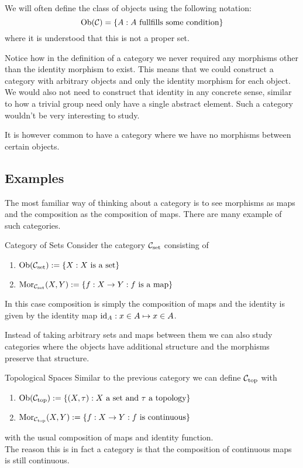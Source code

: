 \begin{notation}{}{}
We will often define the class of objects using the following notation:
\begin{equation*}
    \mathrm {Ob}(\mathcal{C}) = \{A: \text{$A$ fullfills some condition}\}
\end{equation*}
where it is understood that this is not a proper set.
\end{notation}

Notice how in the definition of a category we never required any morphisms other than the identity morphism to exist. This means that we could construct a category with arbitrary objects and only the identity morphism for each object. We would also not need to construct that identity in any concrete sense, similar to how a trivial group need only have a single abstract element.
Such a category wouldn't be very interesting to study.

It is however common to have a category where we have no morphisms between certain objects.

\subsection{Examples}

The most familiar way of thinking about a category is to see morphisms as maps and the composition as the composition of maps. There are many example of such categories.

\begin{example}{Category of Sets}{}
Consider the category $\mathcal{C}_\mathrm{set}$ consisting of
\begin{enumerate}
    \item $\mathrm {Ob}(\mathcal{C}_\mathrm{set}) := \{X: \text{$X$ is a set}\}$
    \item $\mathrm {Mor}_{\mathcal{C}_\mathrm{set}}(X,Y) := \{f: X \to Y: \text{$f$ is a map}\}$
\end{enumerate}
In this case composition is simply the composition of maps and the identity is given by the identity map $\mathrm{id}_A: x \in A \mapsto x \in A$.
\end{example}

Instead of taking arbitrary sets and maps between them we can also study categories where the objects have additional structure and the morphisms preserve that structure.

\begin{example}{Topological Spaces}{}
Similar to the previous category we can define $\mathcal{C}_\mathrm{top}$ with
\begin{enumerate}
    \item $\mathrm {Ob}(\mathcal{C}_\mathrm{top}) := \{(X,\tau) : \text{$X$ a set and $\tau$ a topology}\}$
    \item $\mathrm {Mor}_{\mathcal{C}_\mathrm{top}}(X,Y) := \{f: X \to Y: \text{$f$ is continuous}\}$
\end{enumerate}
with the usual composition of maps and identity function.\\

The reason this is in fact a category is that the composition of continuous maps is still continuous.
\end{example}

